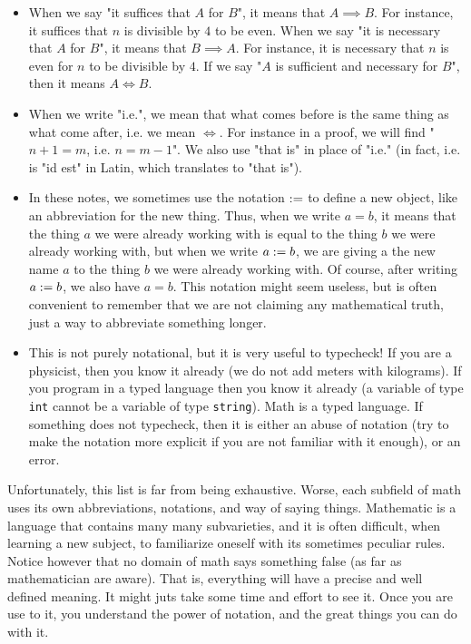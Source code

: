 \begin{itemize}
    \item When we say "it suffices that \( A \) for \( B \)", it means that \( A \implies B \). For instance, it suffices that \( n \) is divisible by \( 4 \) to be even. When we say "it is necessary that \( A \) for \( B \)", it means that \( B \implies A \). For instance, it is necessary that \( n \) is even for \( n \) to be divisible by \( 4 \). If we say "\( A \) is sufficient and necessary for \( B \)", then it means \( A \iff B \).
    
    \item When we write "i.e.", we mean that what comes before is the same thing as what come after, i.e. we mean \( \iff \). For instance in a proof, we will find "\( n + 1 = m \), i.e. \( n = m - 1 \)". We also use "that is" in place of "i.e." (in fact, i.e. is "id est" in Latin, which translates to "that is").
    
    \item In these notes, we sometimes use the notation \( := \) to define a new object, like an abbreviation for the new thing. Thus, when we write \( a = b \), it means that the thing \( a \) we were already working with is equal to the thing \( b \) we were already working with, but when we write \( a := b \), we are giving a the new name \( a \) to the thing \( b \) we were already working with. Of course, after writing \( a := b \), we also have \( a = b \). This notation might seem useless, but is often convenient to remember that we are not claiming any mathematical truth, just a way to abbreviate something longer.
     
    \item This is not purely notational, but it is very useful to typecheck! If you are a physicist, then you know it already (we do not add meters with kilograms). If you program in a typed language then you know it already (a variable of type \verb|int| cannot be a variable of type \verb|string|). Math is a typed language. If something does not typecheck, then it is either an abuse of notation (try to make the notation more explicit if you are not familiar with it enough), or an error.
\end{itemize}

Unfortunately, this list is far from being exhaustive. Worse, each subfield of math uses its own abbreviations, notations, and way of saying things. Mathematic is a language that contains many many subvarieties, and it is often difficult, when learning a new subject, to familiarize oneself with its sometimes peculiar rules. Notice however that no domain of math says something false (as far as mathematician are aware). That is, everything will  have a precise and well defined meaning. It might juts take some time and effort to see it. Once you are use to it, you understand the power of notation, and the great things you can do with it. 
